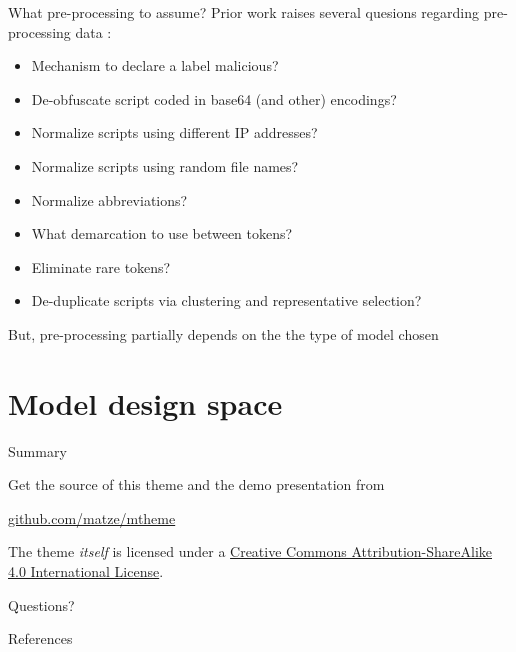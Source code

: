 \documentclass[10pt]{beamer}
\begin{document}
\begin{frame}[fragile]{What pre-processing to assume?}
	Prior work raises several quesions regarding pre-processing data \cite{powershell2018,amsi2019,feye2018}:
	\begin{itemize}
		\item Mechanism to declare a label malicious?
		\item De-obfuscate script coded in base64 (and other) encodings?
		\item Normalize scripts using different IP addresses?
		\item Normalize scripts using random file names?
		\item Normalize abbreviations?
		\item What demarcation to use between tokens?
		\item Eliminate rare tokens?
		\item De-duplicate scripts via clustering and representative selection?
	\end{itemize}
	But, pre-processing partially depends on the the type of model chosen
\end{frame}

\section{Model design space}

\begin{frame}{Summary}

  Get the source of this theme and the demo presentation from

  \begin{center}\url{github.com/matze/mtheme}\end{center}

  The theme \emph{itself} is licensed under a
  \href{http://creativecommons.org/licenses/by-sa/4.0/}{Creative Commons
  Attribution-ShareAlike 4.0 International License}.

  \begin{center}\ccbysa\end{center}

\end{frame}

\begin{frame}[standout]
  Questions?
\end{frame}

\appendix

\begin{frame}[allowframebreaks]{References}

  
  

\end{frame}
\end{document}
